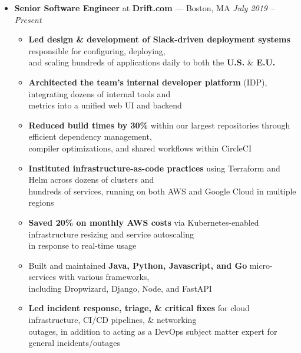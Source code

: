 \documentclass{article}
\begin{document}
\begin{itemize}[label={},leftmargin=*]
  \item \textbf{Senior Software Engineer} at \textbf{Drift.com} --- Boston, MA \hfill {\em July 2019 -- Present}

  \begin{itemize}[label={$\bullet$}]
    \item \textbf{Led design \& development of Slack-driven deployment systems} responsible for configuring, deploying,\\
          and scaling hundreds of applications daily to both the \textbf{U.S.} \& \textbf{E.U.}
    \item \textbf{Architected the team's internal developer platform} (IDP), integrating dozens of internal tools and\\
          metrics into a unified web UI and backend
    \item \textbf{Reduced build times by 30\%} within our largest repositories through efficient dependency management,\\
          compiler optimizations, and shared workflows within CircleCI
    \item \textbf{Instituted infrastructure-as-code practices} using Terraform and Helm across dozens of clusters and\\
          hundreds of services, running on both AWS and Google Cloud in multiple regions
    \item \textbf{Saved 20\% on monthly AWS costs} via Kubernetes-enabled infrastructure resizing and service autoscaling\\
          in response to real-time usage
    \item Built and maintained \textbf{Java, Python, Javascript, and Go} micro-services with various frameworks,\\ 
          including Dropwizard, Django, Node, and FastAPI
    \item \textbf{Led incident response, triage, \& critical fixes} for cloud infrastructure, CI/CD pipelines, \& networking\\
          outages, in addition to acting as a DevOps subject matter expert for general incidents/outages

  \end{itemize}


\end{itemize}
\end{document}
